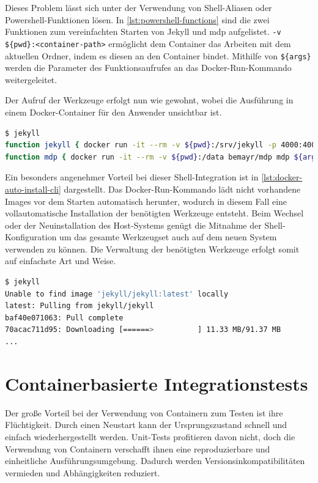 Dieses Problem lässt sich unter der Verwendung von Shell-Aliasen oder Powershell-Funktionen lösen.
In \cref{lst:powershell-functions} sind die zwei Funktionen zum vereinfachten Starten von Jekyll und mdp aufgelistet.
\texttt{-v \$\{pwd\}:<container-path>} ermöglicht dem Container das Arbeiten mit dem aktuellen Ordner, indem es diesen an den Container bindet.
Mithilfe von \texttt{\$\{args\}} werden die Parameter des Funktionsaufrufes an das Docker-Run-Kommando weitergeleitet.

Der Aufruf der Werkzeuge erfolgt nun wie gewohnt, wobei die Ausführung in einem Docker-Container für den Anwender unsichtbar ist.

\begin{lstlisting}[caption=Powershell-Funktionen für Docker-Kommandos, language=bash, label=lst:powershell-functions]
$ jekyll
function jekyll { docker run -it --rm -v ${pwd}:/srv/jekyll -p 4000:4000 jekyll/jekyll /usr/local/bin/jekyll ${args} }
function mdp { docker run -it --rm -v ${pwd}:/data bemayr/mdp mdp ${args} }
\end{lstlisting}
Ein besonders angenehmer Vorteil bei dieser Shell-Integration ist in \cref{lst:docker-auto-install-cli} dargestellt.
Das Docker-Run-Kommando lädt nicht vorhandene Images vor dem Starten automatisch herunter, wodurch in diesem Fall eine vollautomatische Installation der benötigten Werkzeuge entsteht.
Beim Wechsel oder der Neuinstallation des Host-Systems genügt die Mitnahme der Shell-Konfiguration um das gesamte Werkzeugset auch auf dem neuen System verwenden zu können.
Die Verwaltung der benötigten Werkzeuge erfolgt somit auf einfachste Art und Weise.

\begin{lstlisting}[caption=Automatische Installation der Docker-basierten CLI-Anwendungen, language=bash, label=lst:docker-auto-install-cli]
$ jekyll
Unable to find image 'jekyll/jekyll:latest' locally
latest: Pulling from jekyll/jekyll
baf40e071063: Pull complete
70acac711d95: Downloading [======>          ] 11.33 MB/91.37 MB
...
\end{lstlisting}

\section{Containerbasierte Integrationstests}
\label{sec:containerbasiertes-integrationstests}
Der große Vorteil bei der Verwendung von Containern zum Testen ist ihre Flüchtigkeit.
Durch einen Neustart kann der Ursprungszustand schnell und einfach wiederhergestellt werden.
Unit-Tests profitieren davon nicht, doch die Verwendung von Containern verschafft ihnen eine reproduzierbare und einheitliche Ausführungsumgebung.
Dadurch werden Versionsinkompatibilitäten vermieden und Abhängigkeiten reduziert.

